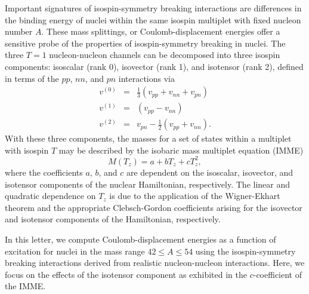 \documentclass[
10pt,
showpacs,preprintnumbers,footinbib,
amsmath,amssymb,
aps,
prl,twocolumn,groupedaddress,superscriptaddress,
showkeys
]{revtex4-1}
\begin{document}
Important signatures of isospin-symmetry breaking interactions are differences in the binding energy of nuclei within the same isospin multiplet with fixed nucleon number $A$. These mass splittings, or Coulomb-displacement energies offer a sensitive probe of the properties of isospin-symmetry breaking in nuclei. The three $T=1$ nucleon-nucleon channels can be decomposed into three isospin components: isoscalar (rank 0), isovector (rank 1), and isotensor (rank 2), defined in terms of the $pp$, $nn$, and $pn$ interactions via
\begin{eqnarray}
\label{e:1}
v^{(0)} & = & \frac{1}{3} (v_{pp} + v_{nn} + v_{pn}) \\
\label{e:2}
v^{(1)} & = & (v_{pp} - v_{nn}) \\
\label{e:3}
v^{(2)} & = & v_{pn} - \frac{1}{2}(v_{pp} + v_{nn}).
\end{eqnarray}
With these three components, the masses for a set of states within a multiplet with isospin $T$ may be described by the isobaric mass multiplet equation (IMME)
\begin{equation}
M (T_z) = a + bT_z + cT_z^2,
\end{equation}
where the coefficients $a$, $b$, and $c$ are dependent on the isoscalar, isovector, and isotensor components of the nuclear Hamiltonian, respectively. The linear and quadratic dependence on $T_z$ is due to the application of the Wigner-Ekhart theorem and the appropriate Clebsch-Gordon coefficients arising for the isovector and isotensor components of the Hamiltonian, respectively.

In this letter, we compute Coulomb-displacement energies as a function of 
excitation for nuclei in the mass range $42 \le A \le 54$ using the isospin-symmetry 
breaking interactions derived from realistic nucleon-nucleon interactions. Here, we focus 
on the effects of the isotensor component as exhibited in the $c$-coefficient of the IMME. 
\end{document}
